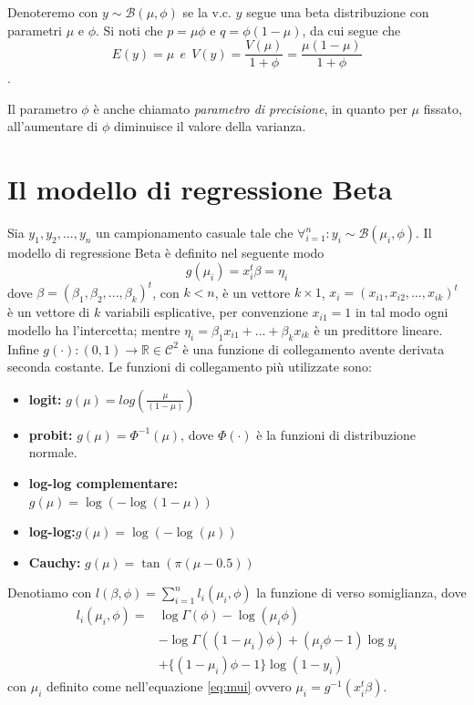 \documentclass[twoside,twocolumn]{article}
\begin{document}
	
	
	Denoteremo con $y \sim \mathbb{\mathcal{B}}(\mu,\phi)$ se  la v.c. $y$ segue una beta distribuzione con parametri $\mu$ e $\phi$. Si noti che $p=\mu\phi$ e $q=\phi(1-\mu)$, da cui segue che $$E(y)=\mu \ \ e \ \ V(y)=\frac{V(\mu)}{1+\phi}=\frac{\mu(1-\mu)}{1+\phi}$$. 
	
	Il parametro $\phi$ è anche chiamato \emph{parametro di precisione}, in quanto per $\mu$ fissato, all'aumentare di $\phi$ diminuisce il valore della varianza.

\section{Il modello di regressione Beta}
Sia $y_1, y_2, ... ,y_n$ un campionamento casuale tale che $\forall_{i=1}^n: y_i \sim \mathbb{\mathcal{B}}(\mu_i, \phi)$. Il modello di regressione Beta è definito nel seguente modo
\begin{equation}g(\mu_i)=x_i^t\beta=\eta_i
\label{eq:mui}
\end{equation}
dove $\beta=(\beta_1, \beta_2, ..., \beta_k)^t$, con $k<n$, è un vettore $k \times 1$, $x_i=(x_{i1}, x_{i2},...,x_{ik})^t$ è un vettore di $k$ variabili esplicative, per convenzione $x_{i1}=1$ in tal modo ogni modello ha l'intercetta; mentre $\eta_i=\beta_1x_{i1}+...+\beta_kx_{ik}$ è un predittore lineare. Infine $g(\cdot):(0,1)\rightarrow\mathbb{R} \in \mathcal{C}^2$ è una funzione  di collegamento avente derivata seconda costante. Le funzioni di collegamento più utilizzate sono:
\begin{itemize}
	\item \textbf{logit:} $g(\mu)=log(\frac{\mu}{(1-\mu)}) $
	\item \textbf{probit:} $g(\mu)=\varPhi^{-1}(\mu)$, dove $\varPhi(\cdot)$ è la funzioni di distribuzione normale.
	\item \textbf{log-log complementare:}\\ $g(\mu)=\log(-\log(1-\mu))$
	\item \textbf{log-log:}$g(\mu)=\log(-\log(\mu))$
	\item \textbf{Cauchy:} $g(\mu)=\tan(\pi(\mu-0.5))$
\end{itemize}

Denotiamo con $l(\beta,\phi)=\sum_{i=1}^{n}l_i(\mu_i,\phi)$ la funzione di verso somiglianza, dove 
\begin{align*}
l_i(\mu_i, \phi)=&\log \Gamma(\phi)-\log (\mu_i\phi)\\
&-\log\Gamma((1-\mu_i)\phi)+(\mu_i\phi-1)\log y_i \\&
+  \{(1-\mu_i)\phi -1 \}\log(1-y_i)
\end{align*}
con $\mu_i$ definito come nell'equazione \eqref{eq:mui} ovvero $\mu_i=g^{-1}(x_i^t\beta)$.
\end{document}
